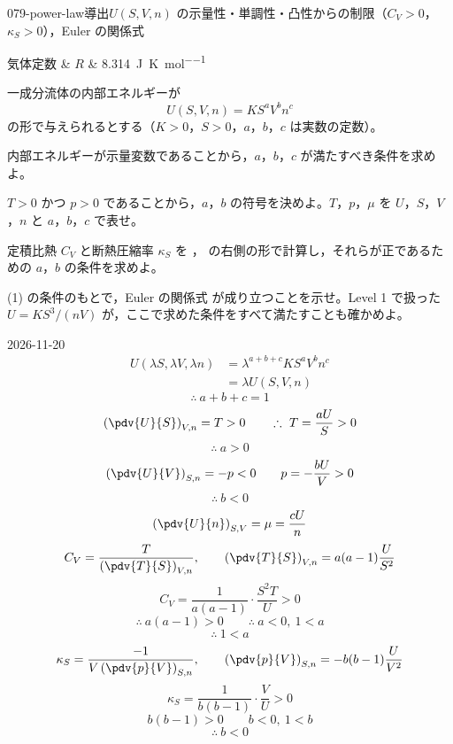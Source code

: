 \documentclass[uplatex,dvipdfmx,a4paper,11pt]{jsarticle}
\begin{document}
\begin{mondai}{079-power-law}{導出}{$U(S,V,n)$ の示量性・単調性・凸性からの制限（$C_{V}>0$，$\kappa_{S}>0$），Euler の関係式}
\begin{teisuu}
  気体定数 & $R$ & \qty{8.314}{\joule\per\kelvin\per\mole}\\
\end{teisuu}
一成分流体の内部エネルギーが
  \[ U(S,V,n) = KS^{a}V^{b}n^{c} \]
  の形で与えられるとする（$K > 0$，$S > 0$，$a$，$b$，$c$ は実数の定数）。
  \begin{shoumon}
    \item 内部エネルギーが示量変数であることから，$a$，$b$，$c$ が満たすべき条件を求めよ。
    \item $T > 0$ かつ $p > 0$ であることから，$a$，$b$ の符号を決めよ。$T$，$p$，$\mu$ を $U$，$S$，$V$，$n$ と $a$，$b$，$c$ で表せ。
    \item 定積比熱 $C_{V}$ と断熱圧縮率 $\kappa_{S}$ を ， の右側の形で計算し，それらが正であるための $a$，$b$ の条件を求めよ。
    \item (1) の条件のもとで，Euler の関係式  が成り立つことを示せ。Level 1 で扱った $U = KS^{3}/(nV)$ が，ここで求めた条件をすべて満たすことも確かめよ。
  \end{shoumon}
\begin{kotaeutsushi}{2026-11-20}
\begin{align*}
U(\lambda S,\lambda V,\lambda n)&=\lambda^{a+b+c}KS^{a}V^{b}n^{c}\\
&=\lambda U(S,V,n)
\end{align*}
\[ \therefore\ a+b+c=1 \]
\[ \left(\pdv{U}{S}\right)_{V,n}=T>0 \qquad \therefore\ T=\frac{aU}{S}>0 \]
\[ \therefore\ a>0 \]
\[ \left(\pdv{U}{V}\right)_{S,n}=-p<0 \qquad p=-\frac{bU}{V}>0 \]
\[ \therefore\ b<0 \]
\[ \left(\pdv{U}{n}\right)_{S,V}=\mu=\frac{cU}{n} \]
\[ C_{V}=\frac{T}{\left(\pdv{T}{S}\right)_{V,n}}, \qquad \left(\pdv{T}{S}\right)_{V,n}=a(a-1)\frac{U}{S^{2}} \]
\[ C_{V}=\frac{1}{a(a-1)}\cdot\frac{S^{2}T}{U}>0 \]
\[ \therefore\ a(a-1)>0 \qquad \therefore\ a<0,\ 1<a \]
\[ \therefore\ 1<a \]
\[ \kappa_{S}=\frac{-1}{V\left(\pdv{p}{V}\right)_{S,n}}, \qquad \left(\pdv{p}{V}\right)_{S,n}=-b(b-1)\frac{U}{V^{2}} \]
\[ \kappa_{S}=\frac{1}{b(b-1)}\cdot\frac{V}{U}>0 \]
\[ b(b-1)>0 \qquad b<0,\ 1<b \]
\[ \therefore\ b<0 \]

\end{kotaeutsushi}
\end{mondai}
\end{document}
